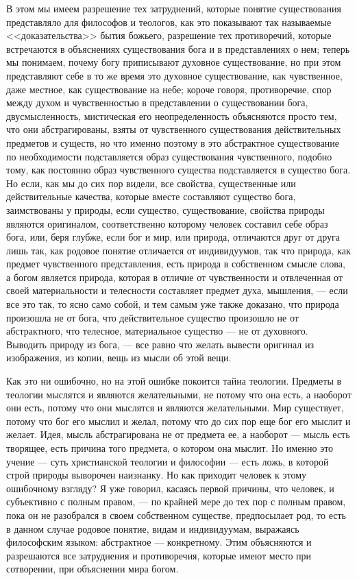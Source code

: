 \documentclass[12pt]{article}
\begin{document}
В этом мы имеем разрешение тех затруднений, которые понятие существования представляло для философов и теологов, как это показывают так называемые <<доказательства>> бытия божьего, разрешение тех противоречий, которые встречаются в объяснениях существования бога и в представлениях о нем; теперь мы понимаем, почему богу приписывают духовное существование, но при этом представляют себе в то же время это духовное существование, как чувственное, даже местное, как существование на небе; короче говоря, противоречие, спор между духом и чувственностью в представлении о существовании бога, двусмысленность, мистическая его неопределенность объясняются просто тем, что они абстрагированы, взяты от чувственного существования действительных предметов и существ, но что именно поэтому в это абстрактное существование по необходимости подставляется образ существования чувственного, подобно тому, как постоянно образ чувственного существа подставляется в существо бога. Но если, как мы до сих пор видели, все свойства, существенные или действительные качества, которые вместе составляют существо бога, заимствованы у природы, если существо, существование, свойства природы являются оригиналом, соответственно которому человек составил себе образ бога, или, беря глубже, если бог и мир, или природа, отличаются друг от друга лишь так, как родовое понятие отличается от индивидуумов, так что природа, как предмет чувственного представления, есть природа в собственном смысле слова, а богом является природа, которая в отличие от чувственности и отвлеченная от своей материальности и телесности составляет предмет духа, мышления, --- если все это так, то ясно само собой, и тем самым уже также доказано, что природа произошла не от бога, что действительное существо произошло не от абстрактного, что телесное, материальное существо --- не от духовного. Выводить природу из бога, --- все равно что желать вывести оригинал из изображения, из копии, вещь из мысли об этой вещи. 

Как это ни ошибочно, но на этой ошибке покоится тайна теологии. Предметы в теологии мыслятся и являются желательными, не потому что она есть, а наоборот они есть, потому что они мыслятся и являются желательными. Мир существует, потому что бог его мыслил и желал, потому что до сих пор еще бог его мыслит и желает. Идея, мысль абстрагирована не от предмета ее, а наоборот --- мысль есть творящее, есть причина того предмета, о котором она мыслит. Но именно это учение --- суть христианской теологии и философии --- есть ложь, в которой строй природы выворочен наизнанку. Но как приходит человек к этому ошибочному взгляду? Я уже говорил, касаясь первой причины, что человек, и субъективно с полным правом, --- по крайней мере до тех пор с полным правом, пока он не разобрался в своем собственном существе, предпосылает род, то есть в данном случае родовое понятие, видам и индивидуумам, выражаясь философским языком: абстрактное --- конкретному. Этим объясняются и разрешаются все затруднения и противоречия, которые имеют место при сотворении, при объяснении мира богом. 
\end{document}
